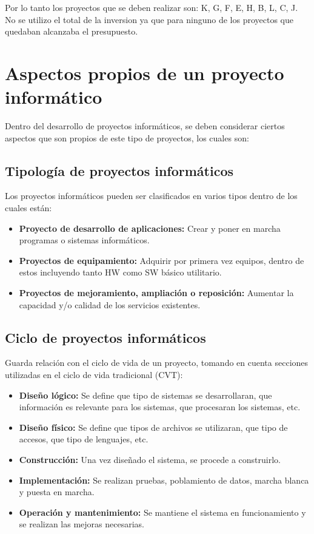 \documentclass{templateNote}
\begin{document}
Por lo tanto los proyectos que se deben realizar son: K, G, F, E, H, B, L, C, J. No se utilizo el total de la inversion ya que para ninguno de los proyectos que quedaban alcanzaba el presupuesto.

\newpage
\section{Aspectos propios de un proyecto informático}
Dentro del desarrollo de proyectos informáticos, se deben considerar ciertos aspectos que son propios de este tipo de proyectos, los cuales son:

\subsection{Tipología de proyectos informáticos}
Los proyectos informáticos pueden ser clasificados en varios tipos dentro de los cuales están:

\begin{itemize}
    \item \textbf{Proyecto de desarrollo de aplicaciones:} Crear y poner en marcha programas o sistemas informáticos.
    \item \textbf{Proyectos de equipamiento:} Adquirir por primera vez equipos, dentro de estos incluyendo tanto HW como SW básico utilitario.
    \item \textbf{Proyectos de mejoramiento, ampliación o reposición:} Aumentar la capacidad y/o calidad de los servicios existentes.
\end{itemize}

\subsection{Ciclo de proyectos informáticos}
Guarda relación con el ciclo de vida de un proyecto, tomando en cuenta secciones utilizadas en el ciclo de vida tradicional (CVT):

\begin{itemize}
    \item \textbf{Diseño lógico:} Se define que tipo de sistemas se desarrollaran, que información es relevante para los sistemas, que procesaran los sistemas, etc.
    \item \textbf{Diseño físico:} Se define que tipos de archivos se utilizaran, que tipo de accesos, que tipo de lenguajes, etc.
    \item \textbf{Construcción:} Una vez diseñado el sistema, se procede a construirlo.
    \item \textbf{Implementación:} Se realizan pruebas, poblamiento de datos, marcha blanca y puesta en marcha.
    \item \textbf{Operación y mantenimiento:} Se mantiene el sistema en funcionamiento y se realizan las mejoras necesarias.
\end{itemize}
\end{document}
